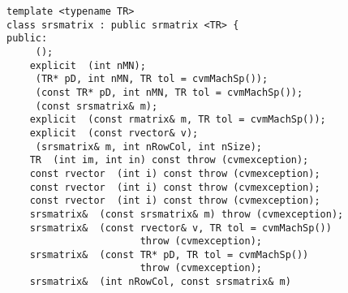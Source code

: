 \bigskip
\noindent
\verb"template <typename TR>"\\
\verb"class srsmatrix : public srmatrix <TR> {"\\
\verb"public:"\\
\verb"    "\verb" ();"\\
\verb"    explicit "\verb" (int nMN);"\\
\verb"    "\verb" (TR* pD, int nMN, TR tol = cvmMachSp());"\\
\verb"    "\verb" (const TR* pD, int nMN, TR tol = cvmMachSp());"\\
\verb"    "\verb" (const srsmatrix& m);"\\
\verb"    explicit "\verb" (const rmatrix& m, TR tol = cvmMachSp());"\\
\verb"    explicit "\verb" (const rvector& v);"\\
\verb"    "\verb" (srsmatrix& m, int nRowCol, int nSize);"\\
\verb"    TR "\verb" (int im, int in) const throw (cvmexception);"\\
\verb"    const rvector "\verb" (int i) const throw (cvmexception);"\\
\verb"    const rvector "\verb" (int i) const throw (cvmexception);"\\
\verb"    const rvector "\verb" (int i) const throw (cvmexception);"\\
\verb"    srsmatrix& "\verb" (const srsmatrix& m) throw (cvmexception);"\\
\verb"    srsmatrix& "\verb" (const rvector& v, TR tol = cvmMachSp())"\\
\verb"                       throw (cvmexception);"\\
\verb"    srsmatrix& "\verb" (const TR* pD, TR tol = cvmMachSp())"\\
\verb"                       throw (cvmexception);"\\
\verb"    srsmatrix& "\verb" (int nRowCol, const srsmatrix& m)"\\
